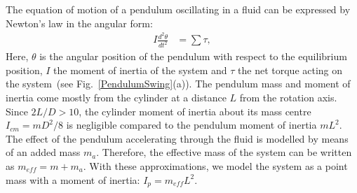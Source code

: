 \documentclass{jfm}
\begin{document}
		
The equation of motion of a pendulum oscillating in a fluid can be expressed by Newton's law in the angular form:
\begin{align}
I \frac{d^2 \theta}{dt^2} &= \sum{\tau},
\label{eqn:Equation of Motion}
\end{align}
Here, $\theta$ is the angular position of the pendulum with respect to the equilibrium position, $I$ the moment of inertia of the system and ${\tau}$ the net torque acting on the system~(see Fig.~\ref{PendulumSwing}(a)). The pendulum mass and moment of inertia come mostly from the cylinder at a distance $L$ from the rotation axis. Since $2 L/D > 10$,  the cylinder moment of inertia about its mass centre $I_{cm} = m D^2/8$ is negligible compared to the pendulum moment of inertia $m L^2$. 
The effect of the pendulum accelerating through the fluid is modelled by means of an added mass $m_a$. Therefore, the effective mass of the system can be written as $m_{eff} = m + m_a$. With these approximations, we model the system as a point mass with a moment of inertia: $I_p= m_{eff} L^2$.
\end{document}
